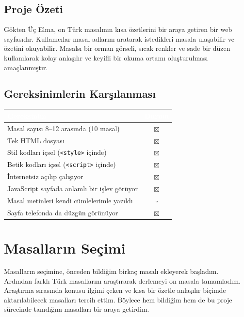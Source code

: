 \documentclass[12pt,a4paper]{article}
\begin{document}
\subsection{Proje Özeti}
Gökten Üç Elma, on Türk masalının kısa özetlerini bir araya getiren bir web sayfasıdır. Kullanıcılar masal adlarını aratarak istedikleri masala ulaşabilir ve özetini okuyabilir. Masalsı bir orman görseli, sıcak renkler ve sade bir düzen kullanılarak kolay anlaşılır ve keyifli bir okuma ortamı oluşturulması amaçlanmıştır.

\subsection{Gereksinimlerin Karşılanması}
\begin{center}
\begin{tabular}{@{}p{8.2cm}c@{}}
\toprule
\rowcolor{ana}\textcolor{white}{\textbf{Gereksinim}} & \textcolor{white}{\textbf{Durum}} \\
\midrule
Masal sayısı 8--12 arasında (10 masal)         & $\boxtimes$ \\
Tek HTML dosyası                                    & $\boxtimes$ \\
Stil kodları içsel (\texttt{<style>} içinde)        & $\boxtimes$ \\
Betik kodları içsel (\texttt{<script>} içinde)      & $\boxtimes$ \\
İnternetsiz açılıp çalışıyor                        & $\boxtimes$ \\
JavaScript sayfada anlamlı bir işlev görüyor        & $\boxtimes$ \\
Masal metinleri kendi cümlelerimle yazıldı          & $\square$ \\
Sayfa telefonda da düzgün görünüyor                 & $\boxtimes$ \\
\bottomrule
\end{tabular}
\end{center}

\section{Masalların Seçimi}
Masalların seçimine, önceden bildiğim birkaç masalı ekleyerek başladım. Ardından farklı Türk masallarını araştırarak derlemeyi on masala tamamladım. Araştırma sırasında konusu ilgimi çeken ve kısa bir özetle anlaşılır biçimde aktarılabilecek masalları tercih ettim. Böylece hem bildiğim hem de bu proje sürecinde tanıdığım masalları bir araya getirdim.
\end{document}
